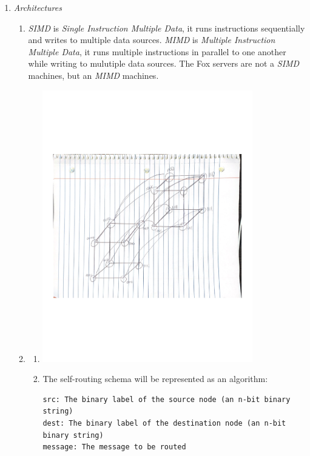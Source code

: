 \documentclass{article}
\begin{document}
\begin{enumerate}

    \item \textit{Architectures}
        \begin{enumerate}
            \item \textit{SIMD} is \textit{Single Instruction Multiple Data}, it runs instructions
                sequentially and writes to multiple data sources. \textit{MIMD} is \textit{Multiple
                Instruction Multiple Data}, it runs multiple instructions in parallel to one another
                while writing to mulutiple data sources. The Fox servers are not a \textit{SIMD}
                machines, but an \textit{MIMD} machines.
            \item
                \begin{enumerate}
                    \item \includegraphics[width=0.8\textwidth,height=0.5\textheight]{hypercube.png}
                    \item The self-routing schema will be represented as an algorithm:
                        \begin{verbatim}
src: The binary label of the source node (an n-bit binary string)
dest: The binary label of the destination node (an n-bit binary string)
message: The message to be routed



\end{verbatim}
\end{enumerate}
\end{enumerate}
\end{enumerate}
\end{document}
